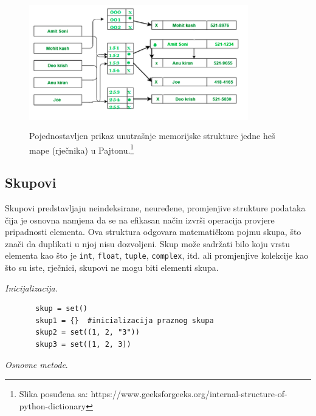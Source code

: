 	
	\begin{figure}
		\centering
		\includegraphics[width=270pt,height=160pt]{slike/dict_mem_organization.png}
 
		\caption{Pojednostavljen prikaz unutrašnje memorijske strukture jedne heš mape (rječnika) u Pajtonu.\footnote{Slika posuđena sa: https://www.geeksforgeeks.org/internal-structure-of-python-dictionary}}		\label{fig: dict_mem_organization}
	\end{figure}
	
\subsection{Skupovi}

Skupovi  predstavljaju neindeksirane, neuređene, promjenjive strukture podataka čija je osnovna namjena da se na efikasan način izvrši operacija provjere pripadnosti elementa. Ova struktura odgovara matematičkom pojmu skupa, što znači da duplikati u njoj nisu dozvoljeni. Skup može sadržati bilo koju vrstu elementa kao što je \texttt{int}, \texttt{float}, \texttt{tuple}, \texttt{complex}, itd. ali promjenjive kolekcije kao što su iste, rječnici, skupovi ne mogu biti elementi skupa. 


\textit{Inicijalizacija. }
\begin{verbatim}
	   skup = set()
	   skup1 = {}  #inicializacija praznog skupa
	   skup2 = set((1, 2, "3"))
	   skup3 = set([1, 2, 3])
\end{verbatim}

\textit{Osnovne metode}. 

